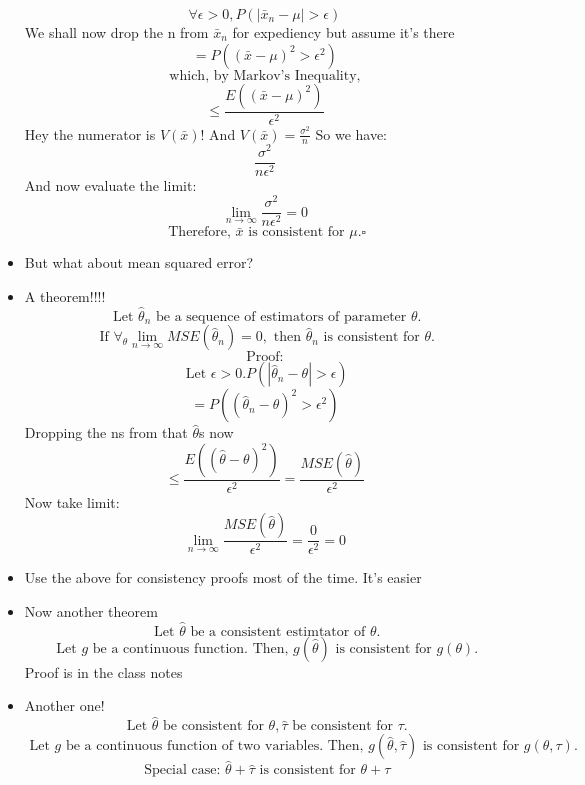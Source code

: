 \documentclass{article}
\begin{document}
\begin{itemize}
      \[
        \forall \epsilon > 0, P( \left| \bar{x}_n - \mu \right| > \epsilon) 
      \] 
      We shall now drop the n from $ \bar{x}_n $ for expediency but assume it's there
      \[
        = P ( {( \bar{x} - \mu)}^2 > \epsilon^2)
      \] \[
        \text{ which, by Markov's Inequality, }
      \] \[
      \leq \frac{E({( \bar{x} - \mu)}^2) }{\epsilon^2}
      \] 
      Hey the numerator is $ V( \bar{x}) $! And $ V( \bar{x}) = \frac{\sigma^2}{n} $ So we have:
      \[
        \frac{\sigma^2}{n \epsilon^2}
      \] 
      And now evaluate the limit:
      \[
        \lim_{n \to \infty} \frac{\sigma^2}{n \epsilon^2} = 0
      \] \[
        \text{ Therefore, } \bar{x} \text{ is consistent for } \mu. \square
      \] 
    \item But what about mean squared error?
    \item A theorem!!!!
      \[
        \text{ Let } \hat{\theta}_n \text{ be a sequence of estimators of parameter } \theta.
      \] \[
      \text{ If } \forall_\theta \lim_{n \to \infty} MSE( \hat{\theta}_n) = 0, \text{ then  } \hat{\theta}_n \text{ is consistent for } \theta.
      \] 
      \[
        \text{ Proof: }
      \] \[
      \text{ Let } \epsilon > 0. P\left( \left| \hat{\theta}_n - \theta \right| > \epsilon\right)
      \] 
      \[
        = P( ( \hat{\theta}_n - \theta)^2 > \epsilon^2)
      \] 
      Dropping the ns from that $ \hat{\theta} $s now
      \[
        \leq \frac{E( (\hat{\theta} - \theta)^2)}{\epsilon^2} = \frac{MSE ( \hat{\theta})}{\epsilon^2}
      \]
      Now take limit:
      \[
        \lim_{n \to \infty} \frac{MSE ( \hat{\theta})}{\epsilon^2}   = \frac{0}{\epsilon^2} = 0
      \] 
    \item Use the above for consistency proofs most of the time. It's easier
    \item Now another theorem
      \[
        \text{ Let } \hat{\theta} \text{ be a consistent estimtator of } \theta.
      \] \[
      \text{ Let } g \text{ be a continuous function. Then,  } g( \hat{\theta}) \text{ is consistent for } g(\theta).
      \] Proof is in the class notes
    \item Another one!
      \[
        \text{ Let } \hat{\theta} \text{ be consistent for } \theta, \hat{\tau} \text{ be consistent for } \tau.
      \] \[
      \text{ Let } g \text{ be a continuous function of two variables. Then, } g( \hat{\theta}, \hat{\tau}) \text{ is consistent for } g( \theta, \tau).
      \] 
      \[
        \text{ Special case: } \hat{\theta} + \hat{\tau} \text{ is consistent for } \theta + \tau
\]
\end{itemize}
\end{document}
